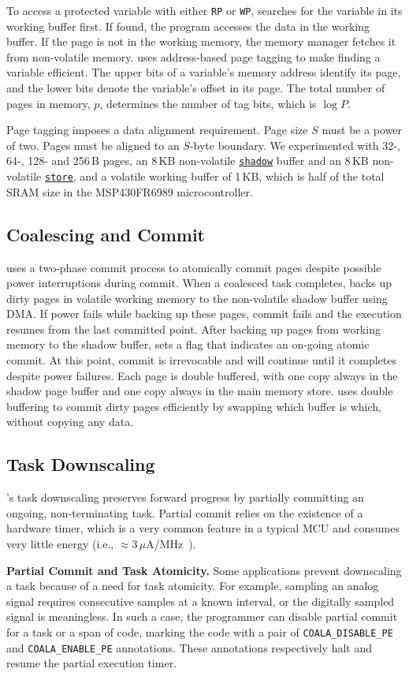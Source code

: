 To access a protected variable with either \texttt{RP}
or \texttt{WP}, \sys searches for the variable in its working buffer first. If
found, the program accesses the data in the working buffer.  If the page is not 
in the working memory, the memory manager fetches it from non-volatile memory. 
%
\sys uses address-based page tagging to make finding a variable efficient.  The
upper bits of a variable's memory address identify its page, and the lower bits
denote the variable's offset in its page. The total number of pages in memory,
$p$, determines the number of tag bits, which is $\log P$.

Page tagging imposes a data alignment requirement.
Page size $S$ must be a power of two. 
%
Pages must be aligned to an $S$-byte boundary. 
%
We experimented with 32-, 64-, 128- and 256\,B pages, an 8\,KB non-volatile \texttt{\underline{shadow}} buffer and
an 8\,KB non-volatile \texttt{\underline{store}}, and a volatile working buffer
of 1\,KB, which is half of the total SRAM size in the MSP430FR6989 microcontroller.
%
\subsection{Coalescing and Commit}
%
\sys uses a two-phase commit process to atomically commit pages despite
possible power interruptions during commit.  When a coalesced task completes,
\sys backs up dirty pages in volatile working memory to the non-volatile
shadow buffer using DMA. 
%
If power fails while backing up these pages, commit fails and the execution
resumes from the last committed point.  After backing up pages from working
memory to the shadow buffer, \sys sets a flag that indicates an on-going atomic
commit.  At this point, commit is irrevocable and will continue until it
completes despite power failures.   
%
Each page is double buffered, with one copy always in the shadow page buffer
and one copy always in the main memory store.  \sys uses double buffering to
commit dirty pages efficiently by swapping which buffer is which, without
copying any data.
%
\subsection{Task Downscaling}
%
\sys's task downscaling preserves forward progress by partially committing an
ongoing, non-terminating task. 
%
Partial commit relies on the existence of a hardware timer, which is a very
common feature in a typical MCU and consumes very little energy (i.e.,
$\approx$3\,$\mu$A/MHz~\cite{msp430datasheet}).  

 \textbf{Partial Commit and Task Atomicity.} Some applications prevent
downscaling a task because of a need for task atomicity.  For example, sampling
an analog signal requires consecutive samples at a known interval, or the
digitally sampled signal is meaningless.  In such a case, the programmer can
disable partial commit for a task or a span of code, marking  the code with a
pair of \texttt{COALA\_DISABLE\_PE} and \texttt{COALA\_ENABLE\_PE} annotations.
These annotations respectively halt and resume the partial execution timer.